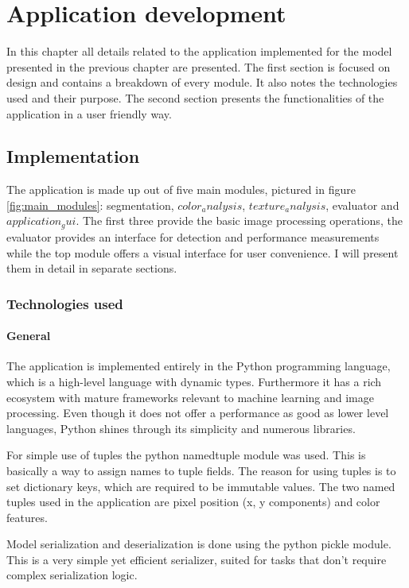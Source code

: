 \documentclass[12pt]{report}
\begin{document}
	\chapter{Application development}
	In this chapter all details related to the application implemented for the model presented in the previous chapter are presented. The first section is focused on design and contains a breakdown of every module. It also notes the technologies used and their purpose. The second section presents the functionalities of the application in a user friendly way.
	
	\section{Implementation}
	The application is made up out of five main modules, pictured in figure \ref{fig:main_modules}: segmentation, $color_analysis$, $texture_analysis$, evaluator and $application_gui$. The first three provide the basic image processing operations, the evaluator provides an interface for detection and performance measurements while the top module offers a visual interface for user convenience. I will present them in detail in separate sections.
	
	\subsection{Technologies used}
	
	\subsubsection{General}
	The application is implemented entirely in the Python programming language, which is a high-level language with dynamic types. Furthermore it has a rich ecosystem with mature frameworks relevant to machine learning and image processing. Even though it does not offer a performance as good as lower level languages, Python shines through its simplicity and numerous libraries.
	
	For simple use of tuples the python namedtuple module was used. This is basically a way to assign names to tuple fields. The reason for using tuples is to set dictionary keys, which are required to be immutable values. The two named tuples used in the application are pixel position (x, y components) and color features.
	
	Model serialization and deserialization is done using the python pickle module. This is a very simple yet efficient serializer, suited for tasks that don't require complex serialization logic.
	
\end{document}
